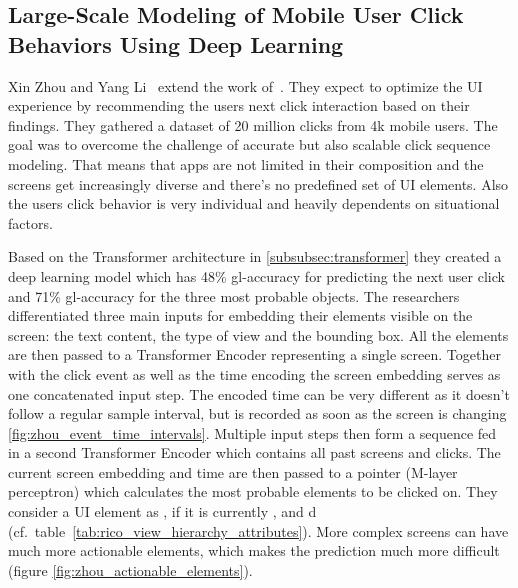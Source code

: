 
\subsection{Large-Scale Modeling of Mobile User Click Behaviors Using Deep Learning}
\label{subsec:user-click-behaviors-deep-learning-transformer}

Xin Zhou and Yang Li~\cite{zhou2021large} extend the work of~\cite{lee2018click}.
They expect to optimize the UI experience by recommending the users next click interaction based on their findings.
They gathered a dataset of 20 million clicks from 4k mobile users.
The goal was to overcome the challenge of accurate but also scalable click sequence modeling.
That means that apps are not limited in their composition and the screens get increasingly diverse and there's no predefined set of UI elements.
Also the users click behavior is very individual and heavily dependents on situational factors.

Based on the Transformer architecture in \ref{subsubsec:transformer} they created a deep learning model which has 48\% \gls{gl-accuracy} for predicting the next user click and 71\% \gls{gl-accuracy} for the three most probable  objects.
The researchers differentiated three main inputs for embedding their elements visible on the screen: the text content, the type of view and the bounding box.
All the elements are then passed to a Transformer Encoder representing a single screen.
Together with the click event as well as the time encoding the screen embedding serves as one concatenated input step.
The encoded time can be very different as it doesn't follow a regular sample interval, but is recorded as soon as the screen is changing \ref{fig:zhou_event_time_intervals}.
Multiple input steps then form a sequence fed in a second Transformer Encoder which contains all past screens and clicks.
The current screen embedding and time are then passed to a pointer (M-layer perceptron) which calculates the most probable  elements to be clicked on.
They consider a UI element as , if it is currently ,  and d (cf.\ table~\ref{tab:rico_view_hierarchy_attributes}).
More complex screens can have much more actionable elements, which makes the prediction much more difficult (figure \ref{fig:zhou_actionable_elements}).


